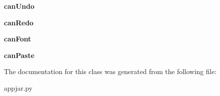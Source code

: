 \begin{DoxyCompactItemize}
{\bfseries can\+Undo}
\item 
\mbox{\label{class_python_01_g_u_i_1_1appjar_1_1_copy_and_paste_add7379bc539691d661a30b7902bfb44c}} 
{\bfseries can\+Redo}
\item 
\mbox{\label{class_python_01_g_u_i_1_1appjar_1_1_copy_and_paste_aca84abbd7ba4f9c95083f8447c44cc47}} 
{\bfseries can\+Font}
\item 
\mbox{\label{class_python_01_g_u_i_1_1appjar_1_1_copy_and_paste_aa7bb249d4b65b3c6d3b81cf2c3ba7ade}} 
{\bfseries can\+Paste}
\end{DoxyCompactItemize}


The documentation for this class was generated from the following file\+:\begin{DoxyCompactItemize}
\item 
appjar.\+py\end{DoxyCompactItemize}

